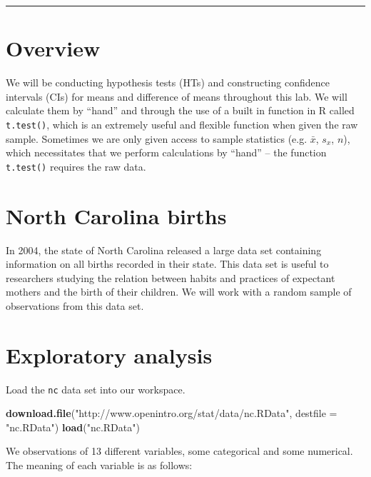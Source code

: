 \documentclass[]{book}
\newenvironment{Shaded}{\begin{snugshade}}{\end{snugshade}}
\newcommand{\KeywordTok}[1]{\textcolor[rgb]{0.13,0.29,0.53}{\textbf{#1}}}
\newcommand{\DataTypeTok}[1]{\textcolor[rgb]{0.13,0.29,0.53}{#1}}
\newcommand{\StringTok}[1]{\textcolor[rgb]{0.31,0.60,0.02}{#1}}
\newcommand{\NormalTok}[1]{#1}
\theoremstyle{definition}
\theoremstyle{definition}
\theoremstyle{definition}
\theoremstyle{remark}
\begin{document}
\begin{center}\rule{0.5\linewidth}{\linethickness}\end{center}

\section{Overview}\label{overview}

We will be conducting hypothesis tests (HTs) and constructing confidence
intervals (CIs) for means and difference of means throughout this lab.
We will calculate them by ``hand'' and through the use of a built in
function in R called \texttt{t.test()}, which is an extremely useful and
flexible function when given the raw sample. Sometimes we are only given
access to sample statistics (e.g. \(\bar{x}\), \(s_x\), \(n\)), which
necessitates that we perform calculations by ``hand'' -- the function
\texttt{t.test()} requires the raw data.

\section{North Carolina births}\label{north-carolina-births}

In 2004, the state of North Carolina released a large data set
containing information on all births recorded in their state. This data
set is useful to researchers studying the relation between habits and
practices of expectant mothers and the birth of their children. We will
work with a random sample of observations from this data set.

\section{Exploratory analysis}\label{exploratory-analysis}

Load the \texttt{nc} data set into our workspace.

\begin{Shaded}
\begin{Highlighting}[]
\KeywordTok{download.file}\NormalTok{(}\StringTok{"http://www.openintro.org/stat/data/nc.RData"}\NormalTok{, }\DataTypeTok{destfile =} \StringTok{"nc.RData"}\NormalTok{)}
\KeywordTok{load}\NormalTok{(}\StringTok{"nc.RData"}\NormalTok{)}
\end{Highlighting}
\end{Shaded}

We observations of 13 different variables, some categorical and some
numerical. The meaning of each variable is as follows:
\end{document}
